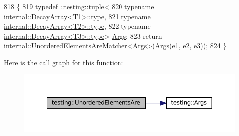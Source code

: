 \begin{DoxyCode}
818                                                                \{
819   typedef ::testing::tuple<
820       \textcolor{keyword}{typename} \hyperlink{namespacegenerate__debs_a50bc9a7ecac9584553e089a448bcde58}{internal::DecayArray<T1>::type},
821       \textcolor{keyword}{typename} \hyperlink{namespacegenerate__debs_a50bc9a7ecac9584553e089a448bcde58}{internal::DecayArray<T2>::type},
822       \textcolor{keyword}{typename} \hyperlink{namespacegenerate__debs_a50bc9a7ecac9584553e089a448bcde58}{internal::DecayArray<T3>::type}> 
      \hyperlink{namespacetesting_a09ac462e8d6ed468cbfaa9c767aee0aa}{Args};
823   \textcolor{keywordflow}{return} internal::UnorderedElementsAreMatcher<Args>(\hyperlink{namespacetesting_a09ac462e8d6ed468cbfaa9c767aee0aa}{Args}(e1, e2, e3));
824 \}
\end{DoxyCode}
Here is the call graph for this function\+:
\nopagebreak
\begin{figure}[H]
\begin{center}
\leavevmode
\includegraphics[width=350pt]{namespacetesting_aec0f9ede2dc05de791c61eae0504a757_cgraph}
\end{center}
\end{figure}
\mbox{\label{namespacetesting_a8dfb2b88d0cacb8ececc069b0b015991}} 
